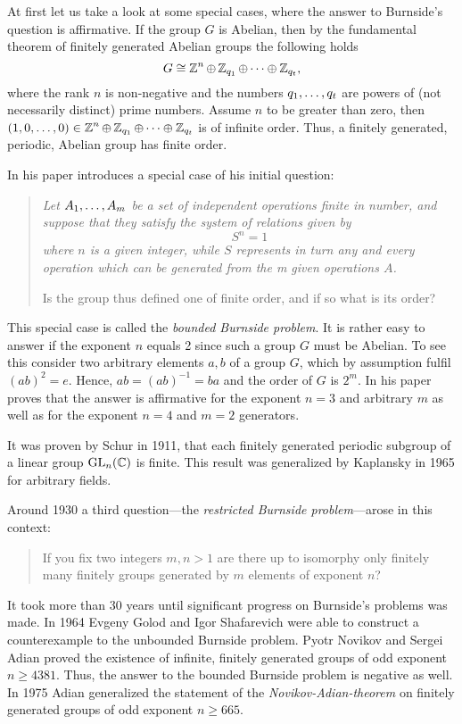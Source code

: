 At first let us take a look at some special cases, where the answer to Burnside's question is affirmative. If the group $G$ is Abelian, then by the fundamental theorem of finitely generated Abelian groups the following holds
\begin{equation*}
G\cong\Z^n \oplus \Z_{q_1} \oplus \cdots \oplus \Z_{q_t},
\end{equation*}
where the rank $n$ is non-negative and the numbers $\seq[t]{q}$ are powers of (not necessarily distinct) prime numbers. Assume $n$ to be greater than zero, then $(1,0,\ldots,0)\in\Z^n \oplus \Z_{q_1} \oplus \cdots \oplus \Z_{q_t}$ is of infinite order. Thus, a finitely generated, periodic, Abelian group has finite order.

In his paper \textcite{burnside1902} introduces a special case of his initial question:
\begin{quotation}
\itshape%
Let $\seq[m]{A}$ be a set of independent operations finite in number, and suppose that they satisfy the system of relations given by
\begin{equation*}
S^n=1
\end{equation*}
where $n$ is a given integer, while $S$ represents in turn any and every operation which can be generated from the m given operations $A$.

Is the group thus defined one of finite order, and if so what is its order?
\end{quotation}
This special case is called the \emph{bounded Burnside problem}. It is rather easy to answer if the exponent $n$ equals 2 since such a group $G$ must be Abelian. To see this consider two arbitrary elements $a,b$ of a group $G$, which by assumption fulfil $(ab)^2=e$. Hence, $ab=(ab)^{-1}=ba$ and the order of $G$ is $2^m$. In his paper \textcite{burnside1902} proves that the answer is affirmative for the exponent $n=3$ and arbitrary $m$ as well as for the exponent $n=4$ and $m=2$ generators.

It was proven by Schur in 1911, that each finitely generated periodic subgroup of a linear group $\mathrm{GL}_n(\C)$ is finite. This result was generalized by Kaplansky in 1965 for arbitrary fields.

Around 1930 a third question---the \emph{restricted Burnside problem}---arose in this context:
\begin{quotation}
If you fix two integers $m,n>1$ are there up to isomorphy only finitely many finitely groups generated by $m$ elements of exponent $n$?
\end{quotation}
It took more than 30 years until significant progress on Burnside's problems was made. In 1964 Evgeny Golod and Igor Shafarevich were able to construct a counterexample to the unbounded Burnside problem. Pyotr Novikov and Sergei Adian proved the existence of infinite, finitely generated groups of odd exponent $n\geq 4381$. Thus, the answer to the bounded Burnside problem is negative as well. In 1975 Adian generalized the statement of the \emph{Novikov-Adian-theorem} on finitely generated groups of odd exponent $n\geq 665$.

